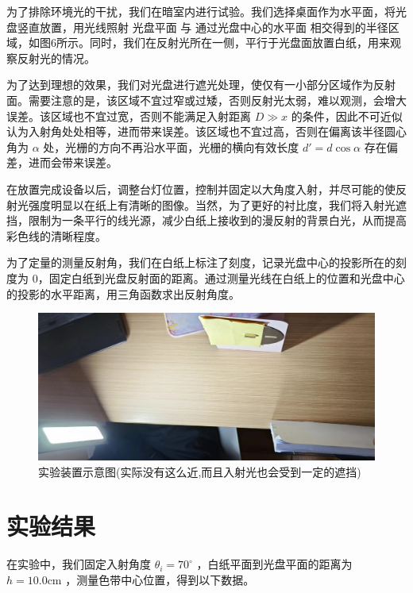 \documentclass[fontset=windows]{article}
\begin{document}
为了排除环境光的干扰，我们在暗室内进行试验。我们选择桌面作为水平面，将光盘竖直放置，用光线照射  光盘平面  与  通过光盘中心的水平面  相交得到的半径区域，如图6所示。同时，我们在反射光所在一侧，平行于光盘面放置白纸，用来观察反射光的情况。

为了达到理想的效果，我们对光盘进行遮光处理，使仅有一小部分区域作为反射面。需要注意的是，该区域不宜过窄或过矮，否则反射光太弱，难以观测，会增大误差。该区域也不宜过宽，否则不能满足入射距离 $D \gg x$ 的条件，因此不可近似认为入射角处处相等，进而带来误差。该区域也不宜过高，否则在偏离该半径圆心角为 $\alpha$ 处，光栅的方向不再沿水平面，光栅的横向有效长度 $d' = d\cos \alpha$ 存在偏差，进而会带来误差。

在放置完成设备以后，调整台灯位置，控制并固定以大角度入射，并尽可能的使反射光强度明显以在纸上有清晰的图像。当然，为了更好的衬比度，我们将入射光遮挡，限制为一条平行的线光源，减少白纸上接收到的漫反射的背景白光，从而提高彩色线的清晰程度。

为了定量的测量反射角，我们在白纸上标注了刻度，记录光盘中心的投影所在的刻度为 0，固定白纸到光盘反射面的距离。通过测量光线在白纸上的位置和光盘中心的投影的水平距离，用三角函数求出反射角度。

\begin{figure}[htbp]
	\centering
	\includegraphics[scale=0.1]{4.jpg}
	\caption{ 实验装置示意图(实际没有这么近,而且入射光也会受到一定的遮挡) }
	\label{9}
\end{figure}

\newpage

\section{实验结果}

在实验中，我们固定入射角度 $\theta_i = 70^\circ$ ，白纸平面到光盘平面的距离为 $h = 10.0\mathrm{cm}$ ，测量色带中心位置，得到以下数据。
\end{document}
